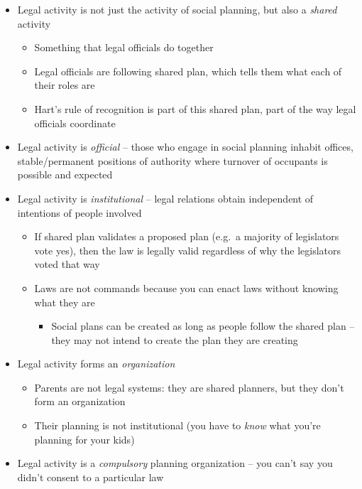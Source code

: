 \begin{itemize}
\tightlist
\item
  Legal activity is not just the activity of social planning, but also a
  \emph{shared} activity

  \begin{itemize}
  \tightlist
  \item
    Something that legal officials do together
  \item
    Legal officials are following shared plan, which tells them what
    each of their roles are
  \item
    Hart's rule of recognition is part of this shared plan, part of the
    way legal officials coordinate
  \end{itemize}
\item
  Legal activity is \emph{official} -- those who engage in social
  planning inhabit offices, stable/permanent positions of authority
  where turnover of occupants is possible and expected
\item
  Legal activity is \emph{institutional} -- legal relations obtain
  independent of intentions of people involved

  \begin{itemize}
  \tightlist
  \item
    If shared plan validates a proposed plan (e.g.~a majority of
    legislators vote yes), then the law is legally valid regardless of
    why the legislators voted that way
  \item
    Laws are not commands because you can enact laws without knowing
    what they are

    \begin{itemize}
    \tightlist
    \item
      Social plans can be created as long as people follow the shared
      plan -- they may not intend to create the plan they are creating
    \end{itemize}
  \end{itemize}
\item
  Legal activity forms an \emph{organization}

  \begin{itemize}
  \tightlist
  \item
    Parents are not legal systems: they are shared planners, but they
    don't form an organization
  \item
    Their planning is not institutional (you have to \emph{know} what
    you're planning for your kids)
  \end{itemize}
\item
  Legal activity is a \emph{compulsory} planning organization -- you
  can't say you didn't consent to a particular law
\end{itemize}

